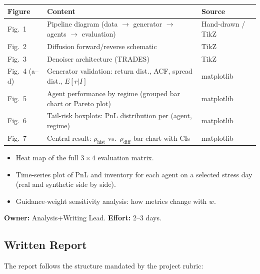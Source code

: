 \documentclass[11pt,a4paper]{article}
\begin{document}
\begin{center}
\begin{tabularx}{\textwidth}{lXl}
\toprule
\textbf{Figure} & \textbf{Content} & \textbf{Source} \\
\midrule
Fig.~1 & Pipeline diagram (data $\to$ generator $\to$ agents $\to$ evaluation) & Hand-drawn / TikZ \\
Fig.~2 & Diffusion forward/reverse schematic & TikZ \\
Fig.~3 & Denoiser architecture (TRADES) & TikZ \\
Fig.~4 (a--d) & Generator validation: return dist., ACF, spread dist., $E[r|I]$ & matplotlib \\
Fig.~5 & Agent performance by regime (grouped bar chart or Pareto plot) & matplotlib \\
Fig.~6 & Tail-risk boxplots: PnL distribution per (agent, regime) & matplotlib \\
Fig.~7 & Central result: $\rho_{\text{hist}}$ vs.\ $\rho_{\text{diff}}$ bar chart with CIs & matplotlib \\
\bottomrule
\end{tabularx}
\end{center}

\begin{deepbox}
  \begin{itemize}[nosep]
    \item Heat map of the full $3 \times 4$ evaluation matrix.
    \item Time-series plot of PnL and inventory for each agent on a selected stress day (real and synthetic side by side).
    \item Guidance-weight sensitivity analysis: how metrics change with $w$.
  \end{itemize}
\end{deepbox}

\textbf{Owner:} Analysis+Writing Lead. \quad \textbf{Effort:} 2--3 days.

\subsection{Written Report}

The report follows the structure mandated by the project rubric:
\end{document}
